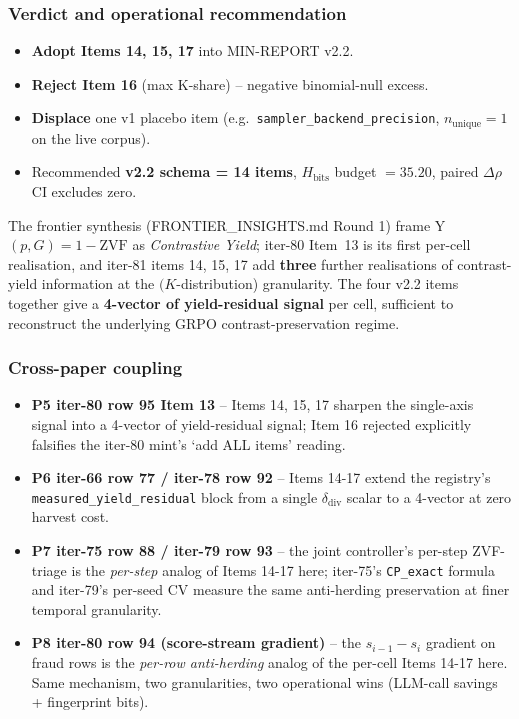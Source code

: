 \subsubsection{Verdict and operational recommendation}
\begin{itemize}
  \item \textbf{Adopt Items 14, 15, 17} into MIN-REPORT v2.2.
  \item \textbf{Reject Item 16} (max K-share) -- negative binomial-null excess.
  \item \textbf{Displace} one v1 placebo item (e.g.\ \texttt{sampler\_backend\_precision}, $n_{\mathrm{unique}}=1$ on the live corpus).
  \item Recommended \textbf{v2.2 schema = 14 items}, $H_{\mathrm{bits}}$ budget $= 35.20$, paired $\Delta\rho$ CI excludes zero.
\end{itemize}
The frontier synthesis (FRONTIER\_INSIGHTS.md Round 1) frame
Y$(p,G) = 1 - \mathrm{ZVF}$ as \emph{Contrastive Yield}; iter-80 Item~13 is
its first per-cell realisation, and iter-81 items 14, 15, 17 add
\textbf{three} further realisations of contrast-yield information at the
$(K$-distribution) granularity. The four v2.2 items together give a
\textbf{4-vector of yield-residual signal} per cell, sufficient to
reconstruct the underlying GRPO contrast-preservation regime.

\subsubsection{Cross-paper coupling}
\begin{itemize}
  \item \textbf{P5 iter-80 row 95 Item 13} -- Items 14, 15, 17 sharpen the
        single-axis signal into a 4-vector of yield-residual signal; Item 16
        rejected explicitly falsifies the iter-80 mint's `add ALL items' reading.
  \item \textbf{P6 iter-66 row 77 / iter-78 row 92} -- Items 14-17 extend
        the registry's \texttt{measured\_yield\_residual} block from a single
        $\delta_{\mathrm{div}}$ scalar to a 4-vector at zero harvest cost.
  \item \textbf{P7 iter-75 row 88 / iter-79 row 93} -- the joint controller's
        per-step ZVF-triage is the \emph{per-step} analog of Items 14-17 here;
        iter-75's \texttt{CP\_exact} formula and iter-79's per-seed CV measure
        the same anti-herding preservation at finer temporal granularity.
  \item \textbf{P8 iter-80 row 94 (score-stream gradient)} -- the
        $s_{i-1} - s_i$ gradient on fraud rows is the \emph{per-row anti-herding}
        analog of the per-cell Items 14-17 here. Same mechanism, two
        granularities, two operational wins (LLM-call savings + fingerprint
        bits).
\end{itemize}

